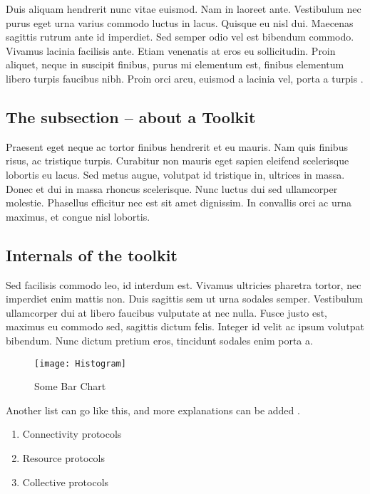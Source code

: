 \label{sec-rl}

Duis aliquam hendrerit nunc vitae euismod. Nam in laoreet ante. Vestibulum nec purus eget urna varius commodo luctus in lacus. Quisque eu nisl dui. Maecenas sagittis rutrum ante id imperdiet. Sed semper odio vel est bibendum commodo. Vivamus lacinia facilisis ante. Etiam venenatis at eros eu sollicitudin. Proin aliquet, neque in suscipit finibus, purus mi elementum est, finibus elementum libero turpis faucibus nibh. Proin orci arcu, euismod a lacinia vel, porta a turpis \cite{apples1}.

\subsection{The subsection -- about a Toolkit}

Praesent eget neque ac tortor finibus hendrerit et eu mauris. Nam quis finibus risus, ac tristique turpis. Curabitur non mauris eget sapien eleifend scelerisque lobortis eu lacus. Sed metus augue, volutpat id tristique in, ultrices in massa. Donec et dui in massa rhoncus scelerisque. Nunc luctus dui sed ullamcorper molestie. Phasellus efficitur nec est sit amet dignissim. In convallis orci ac urna maximus, et congue nisl lobortis.

\subsection{Internals of the toolkit}

Sed facilisis commodo leo, id interdum est. Vivamus ultricies pharetra tortor, nec imperdiet enim mattis non. Duis sagittis sem ut urna sodales semper. Vestibulum ullamcorper dui at libero faucibus vulputate at nec nulla. Fusce justo est, maximus eu commodo sed, sagittis dictum felis. Integer id velit ac ipsum volutpat bibendum. Nunc dictum pretium eros, tincidunt sodales enim porta a.

\begin{figure}[ht]
  \begin{center}
    \texttt{[image: Histogram]}
    \caption{Some Bar Chart}
  \end{center}
\end{figure}

Another list can go like this, and more explanations can be added \cite{apples2}.
\begin{enumerate}
  \item
  Connectivity protocols 
  \item
  Resource protocols 
  \item
  Collective protocols 
\end{enumerate}

